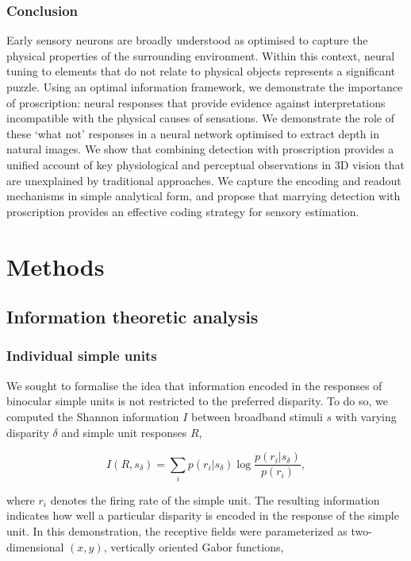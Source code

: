 \subsubsection*{Conclusion}

Early sensory neurons are broadly understood as optimised to capture the physical properties of the surrounding environment. Within this context, neural tuning to elements that do not relate to physical objects represents a significant puzzle. Using an optimal information framework, we demonstrate the importance of proscription: neural responses that provide evidence against interpretations incompatible with the physical causes of sensations. We demonstrate the role of these `what not' responses in a neural network optimised to extract depth in natural images. We show that combining detection with proscription provides a unified account of key physiological and perceptual observations in 3D vision that are unexplained by traditional approaches. We capture the encoding and readout mechanisms in simple analytical form, and propose that marrying detection with proscription provides an effective coding strategy for sensory estimation.

\section{Methods}

\subsection*{Information theoretic analysis}

\subsubsection*{Individual simple units}
We sought to formalise the idea that information encoded in the responses of binocular simple units is not restricted to the preferred disparity. To do so, we computed the Shannon information $I$ between broadband stimuli $s$ with varying disparity $\delta$ and simple unit responses $R$,

\begin{equation}
  I(R, s_\delta) = \sum_i p(r_i|s_\delta) \log \frac{p(r_i|s_\delta)}{p(r_i)},
  \label{eq:ShannonInformation}
\end{equation}
 
where $r_i$ denotes the firing rate of the simple unit. The resulting information indicates how well a particular disparity is encoded in the response of the simple unit. In this demonstration, the receptive fields were parameterized as two-dimensional $(x,y)$, vertically oriented Gabor functions,

